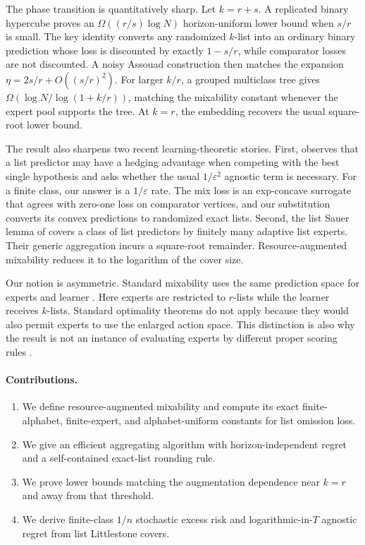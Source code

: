 \documentclass{article}
\theoremstyle{definition}
\theoremstyle{remark}
\newcommand{\1}{\mathbf 1}
\begin{document}
The phase transition is quantitatively sharp. Let \(k=r+s\). A replicated binary hypercube proves an \(\Omega((r/s)\log N)\) horizon-uniform lower bound when \(s/r\) is small. The key identity converts any randomized \(k\)-list into an ordinary binary prediction whose loss is discounted by exactly \(1-s/r\), while comparator losses are not discounted. A noisy Assouad construction then matches the expansion \(\eta=2s/r+O((s/r)^2)\). For larger \(k/r\), a grouped multiclass tree gives \(\Omega(\log N/\log(1+k/r))\), matching the mixability constant whenever the expert pool supports the tree. At \(k=r\), the embedding recovers the usual square-root lower bound.

The result also sharpens two recent learning-theoretic stories. First, \citet{pabbaraju2026optimal} observes that a list predictor may have a hedging advantage when competing with the best single hypothesis and asks whether the usual \(1/\varepsilon^2\) agnostic term is necessary. For a finite class, our answer is a \(1/\varepsilon\) rate. The mix loss is an exp-concave surrogate that agrees with zero-one loss on comparator vertices, and our substitution converts its convex predictions to randomized exact lists. Second, the list Sauer lemma of \citet{moran2023list} covers a class of list predictors by finitely many adaptive list experts. Their generic aggregation incurs a square-root remainder. Resource-augmented mixability reduces it to the logarithm of the cover size.

Our notion is asymmetric. Standard mixability uses the same prediction space for experts and learner \citep{vovk1998game,vanerven2012mixability,reid2015generalized}. Here experts are restricted to \(r\)-lists while the learner receives \(k\)-lists. Standard optimality theorems do not apply because they would also permit experts to use the enlarged action space. This distinction is also why the result is not an instance of evaluating experts by different proper scoring rules \citep{chernov2009evaluators}.

\paragraph{Contributions.}
\begin{enumerate}
\item We define resource-augmented mixability and compute its exact finite-alphabet, finite-expert, and alphabet-uniform constants for list omission loss.
\item We give an efficient aggregating algorithm with horizon-independent regret and a self-contained exact-list rounding rule.
\item We prove lower bounds matching the augmentation dependence near \(k=r\) and away from that threshold.
\item We derive finite-class \(1/n\) stochastic excess risk and logarithmic-in-\(T\) agnostic regret from list Littlestone covers.
\end{enumerate}
\end{document}
